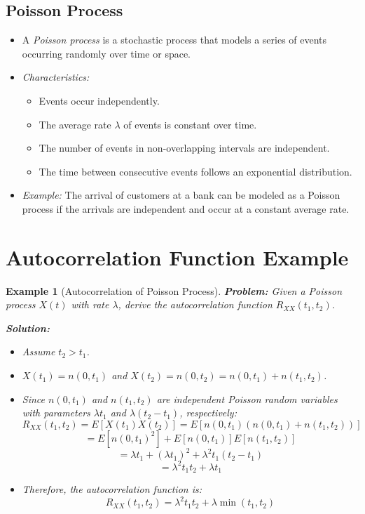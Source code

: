 \documentclass[12pt]{article}
\newtheorem{example}{Example}
\begin{document}
\subsection{Poisson Process}
\begin{itemize}
    \item A \textit{Poisson process} is a stochastic process that models a series of events occurring randomly over time or space.
    \item \textit{Characteristics:}
    \begin{itemize}
        \item Events occur independently.
        \item The average rate \( \lambda \) of events is constant over time.
        \item The number of events in non-overlapping intervals are independent.
        \item The time between consecutive events follows an exponential distribution.
    \end{itemize}
    \item \textit{Example:} The arrival of customers at a bank can be modeled as a Poisson process if the arrivals are independent and occur at a constant average rate.
\end{itemize}

\section{Autocorrelation Function Example}

\begin{example}[Autocorrelation of Poisson Process]
    \textbf{Problem:} Given a Poisson process \( X(t) \) with rate \( \lambda \), derive the autocorrelation function \( R_{XX}(t_1, t_2) \).
    
    \textbf{Solution:}
    \begin{itemize}
        \item Assume \( t_2 > t_1 \).
        \item \( X(t_1) = n(0, t_1) \) and \( X(t_2) = n(0, t_2) = n(0, t_1) + n(t_1, t_2) \).
        \item Since \( n(0, t_1) \) and \( n(t_1, t_2) \) are independent Poisson random variables with parameters \( \lambda t_1 \) and \( \lambda (t_2 - t_1) \), respectively:
        \[
        R_{XX}(t_1, t_2) = E[X(t_1) X(t_2)] = E\left[ n(0, t_1) (n(0, t_1) + n(t_1, t_2)) \right]
        \]
        \[
        = E[n(0, t_1)^2] + E[n(0, t_1)] E[n(t_1, t_2)]
        \]
        \[
        = \lambda t_1 + (\lambda t_1)^2 + \lambda^2 t_1 (t_2 - t_1)
        \]
        \[
        = \lambda^2 t_1 t_2 + \lambda t_1
        \]
        \item Therefore, the autocorrelation function is:
        \[
        R_{XX}(t_1, t_2) = \lambda^2 t_1 t_2 + \lambda \min(t_1, t_2)
        \]
    \end{itemize}
\end{example}
\end{document}
